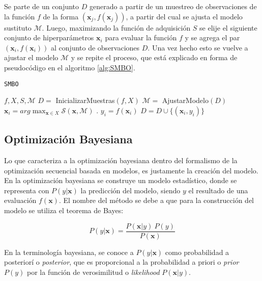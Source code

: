 Se parte de un conjunto $D$ generado a partir de un muestreo de observaciones de la función $f$ de la forma $(\textbf{x}_j, f(\textbf{x}_j))$, a partir del cual se ajusta el modelo sustituto $\mathcal{M}$. Luego, maximizando la función de adquisición $S$ se elije el siguiente conjunto de hiperparámetros $\textbf{x}_i$ para evaluar la función $f$ y se agrega el par $(\textbf{x}_i, f(\textbf{x}_i))$ al conjunto de observaciones $D$. Una vez hecho esto se vuelve a ajustar el modelo $\mathcal{M}$ y se repite el proceso, que está explicado en forma de pseudocódigo en el algoritmo \ref{alg:SMBO}.


\begin{algorithm}
\caption{\texttt{SMBO}}
\label{alg:SMBO}
\begin{algorithmic}[1]
\Require $f, X, S,\mathcal{M}$
\State $D =$ InicializarMuestras$(f, X)$
\vspace{1mm}
	\State $\mathcal{M} =$ AjustarModelo$(D)$
	\State $\textbf{x}_{i} = arg \max_{\textbf{x}\in X} \mathcal{S}(\textbf{x}, \mathcal{M})$ .
	\State $y_i = f(\textbf{x}_i)$	
	\State $D = D \cup \{(\textbf{x}_i, y_i)\}$
\EndFor
\vspace{3mm}

\end{algorithmic}
\end{algorithm}




\subsection{Optimización Bayesiana}

Lo que caracteriza a la optimización bayesiana dentro del formalismo de la optimización secuencial basada en modelos, es justamente la creación del modelo.
En la optimización bayesiana se construye un modelo estadístico, donde se representa con  $P(y|\textbf{x})$ la predicción del modelo, siendo $y$ el resultado de una evaluación $f(\textbf{x})$. El nombre del método se debe a que para la construcción del modelo se utiliza el teorema de Bayes:
  
 \[
 P(y|\textbf{x}) = \frac{P(\textbf{x}|y) \ P(y)}{P(\textbf{x})}
 \]
 
 En la terminología bayesiana, se conoce a $P(y|\textbf{x})$ como probabilidad a posteriorí o \textit{posterior}, que es proporcional a la probabilidad a priori o \textit{prior} $P(y)$ por la función de verosimilitud o \textit{likelihood} $P(\textbf{x}|y)$.
 
